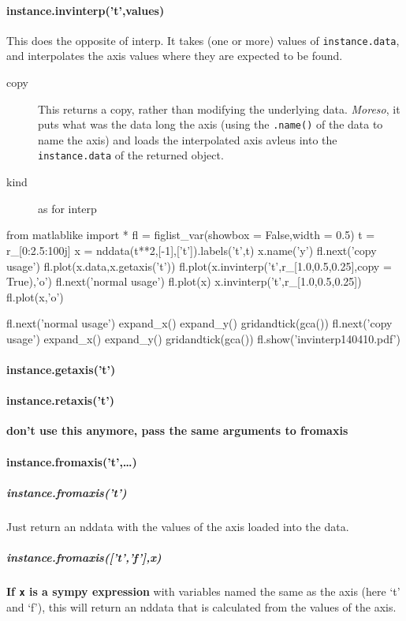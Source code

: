 \paragraph{instance.invinterp('t',values)}
This does the opposite of interp.
It takes (one or more) values of
    \texttt{instance.data}, and
    interpolates the axis values where
    they are expected to be found.
\begin{mykwargs}
    \begin{description}
        \item[copy] This returns a copy, rather than modifying the underlying data.
            \textit{Moreso}, it puts what was the data long the axis (using the \texttt{.name()} of the data to name the axis) and loads the interpolated axis avleus into the \texttt{instance.data} of the returned object.
        \item[kind] as for interp
    \end{description}
\end{mykwargs}

\begin{python}
from matlablike import *
fl = figlist_var(showbox = False,width = 0.5)
t = r_[0:2.5:100j]
x = nddata(t**2,[-1],['t']).labels('t',t)
x.name('y')
fl.next('copy usage')
fl.plot(x.data,x.getaxis('t'))
fl.plot(x.invinterp('t',r_[1.0,0.5,0.25],copy = True),'o')
fl.next('normal usage')
fl.plot(x)
x.invinterp('t',r_[1.0,0.5,0.25])
fl.plot(x,'o')

fl.next('normal usage')
expand_x()
expand_y()
gridandtick(gca())
fl.next('copy usage')
expand_x()
expand_y()
gridandtick(gca())
fl.show('invinterp140410.pdf')
\end{python}

\paragraph{instance.getaxis('t')}
\paragraph{instance.retaxis('t')}
\textbf{don't use this anymore, pass the same arguments to fromaxis}
\paragraph{instance.fromaxis('t',\ldots)}
\subparagraph{instance.fromaxis('t')}
Just return an nddata with the values of the axis loaded into the data.
\subparagraph{instance.fromaxis(['t','f'],x)}
\textbf{If \texttt{x} is a sympy expression} with variables named the same as the axis (here `t' and `f'), this will return an nddata that is calculated from the values of the axis.

